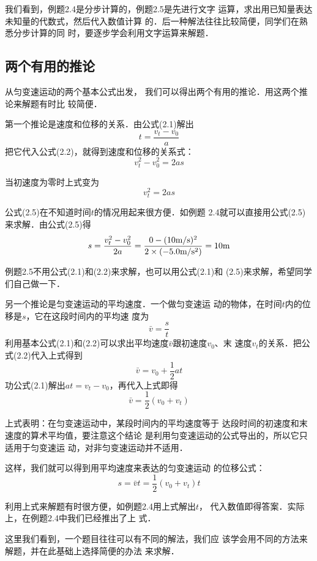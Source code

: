   我们看到，例题2.4是分步计算的，例题2.5是先进行文字
运算，求出用已知量表达未知量的代数式，然后代入数值计算
的．后一种解法往往比较简便，同学们在熟悉分步计算的同
时，要逐步学会利用文字运算来解题．

    \subsection{两个有用的推论}

从匀变速运动的两个基本公式出发，
我们可以得出两个有用的推论．用这两个推论来解题有时比
较简便．

第一个推论是速度和位移的关系．由公式(2.1)解出
\[t=\frac{v_t-v_0}{a} \]
把它代入公式(2.2)，就得到速度和位移的关系式：
\begin{equation}
v^2_t-v^2_0=2as
\end{equation}

当初速度为零时上式变为
\begin{equation}
v^2_t=2as
\end{equation}

    公式(2.5)在不知道时间$t$的情况用起来很方便．如例题
2.4就可以直接用公式(2.5)来求解．由公式(2.5)得
\[s=\frac{v^2_t-v^2_0}{2a}=\frac{0-(10\text{m}/\text{s})^2}{2\times (-5.0\text{m}/\text{s}^2)}=10{\rm m}\]

    例题2.5不用公式(2.1)和(2.2)来求解，也可以用公式(2.1)和
(2.5)来求解，希望同学们自己做一下．

    另一个推论是匀变速运动的平均速度．一个做匀变速运
动的物体，在时间$t$内的位移是$s$，它在这段时间内的平均速
度为
\[\bar v=\frac{s}{t} \]
利用基本公式(2.1)和(2.2)可以求出平均速度$\bar v$跟初速度$v_0$、末
速度$v_t$的关系．把公式(2.2)代入上式得到
\[\bar v=v_0+\frac{1}{2}at \]
功公式(2.1)解出$at=v_t-v_0$，再代入上式即得
\begin{equation}
\bar v=\frac{1}{2}(v_0+v_t)
\end{equation}

    上式表明：在匀变速运动中，某段时间内的平均速度等于
达段时间的初速度和末速度的算术平均值，要注意这个结论
是利用匀变速运动的公式导出的，所以它只适用于匀变速运
动，对非匀变速运动并不适用．

    这样，我们就可以得到用平均速度来表达的匀变速运动
的位移公式：
\[s=\bar v t=\frac{1}{2} (v_0+v_t)t\]

利用上式来解题有时很方便，如例题2.4用上式解出$t$，
代入数值即得答案．实际上，在例题2.4中我们已经推出了上
式．

    这里我们看到，一个题目往往可以有不同的解法，我们应
该学会用不同的方法来解题，并在此基础上选择简便的办法
来求解．


